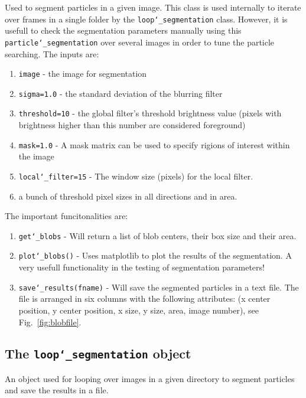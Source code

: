 \documentclass[10pt,a4paper]{article}
\begin{document}
Used to segment particles in a given image. This class is used internally to iterate over frames in a single folder by the \texttt{loop\char`_segmentation} class. However, it is usefull to check the segmentation parameters manually using this \texttt{particle\char`_segmentation} over several images in order to tune the particle searching. The inputs are:
%
\begin{enumerate}
	\item \texttt{image} - the image for segmentation
	\item \texttt{sigma=1.0} - the standard deviation of the blurring filter
	\item \texttt{threshold=10} - the global filter's threshold brightness value (pixels with brightness higher than this number are considered foreground) 
	\item \texttt{mask=1.0} - A mask matrix can be used to specify rigions of interest within the image
	\item \texttt{local\char`_filter=15} - The window size (pixels) for the local filter.
	\item a bunch of threshold pixel sizes in all directions and in area.
\end{enumerate}


The important funcitonalities are:
%
\begin{enumerate}
	\item \texttt{get\char`_blobs} - Will return a list of blob centers, their box size and their area.
	
	\item \texttt{plot\char`_blobs()} - Uses matplotlib to plot the results of the segmentation. A very usefull functionality in the testing of segmentation parameters!
	
	\item \texttt{save\char`_results(fname)} - Will save the segmented particles in a text file. The file is arranged in six columns with the following attributes: (x center position, y center position, x size, y size, area, image number), see Fig.~\ref{fig:blobfile}.
\end{enumerate}






\subsection{The \texttt{loop\char`_segmentation} object} 


An object used for looping over images in a given directory to segment particles
and save the results in a file.
\end{document}
